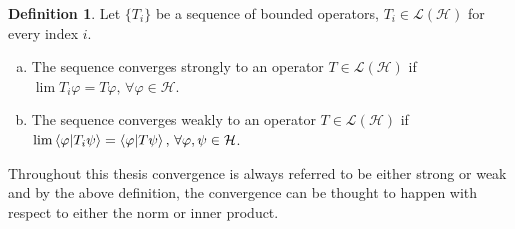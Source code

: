 \documentclass[a4paper,12pt]{wihuri}
\theoremstyle{definition}
\newtheorem{definition}{Definition}
\newtheorem{example}{Example}
\numberwithin{definition}{section}
\numberwithin{example}{section}
\numberwithin{theorem}{section}
\numberwithin{proposition}{section}
\numberwithin{lemma}{section}
\newcommand{\hi}{\mathcal{H}}%
\newcommand{\lin}{\mathcal{L}}%
\newcommand{\norm}[1]{\left\lVert#1\right\rVert}
\begin{document}
\begin{definition}
Let $\{ T_i\}$ be a sequence of bounded operators, $T_i \in \lin(\hi)$ for every index $i$. 
\begin{enumerate}[a)]
\item The sequence converges strongly to an operator $T \in \lin(\hi)$ if $\lim T_i \varphi = T\varphi,\, \forall \varphi \in \hi$.
\item The sequence converges weakly to an operator $T \in \lin(\hi)$ if $\lim \braket{\varphi | T_i \psi} = \braket{\varphi | T\psi},\, \forall \varphi,\psi \in \hi$.
\end{enumerate}
\end{definition}

Throughout this thesis convergence is always referred to be either strong or weak and by the above definition, the convergence can be thought to happen with respect to either the norm or inner product.







\end{document}
